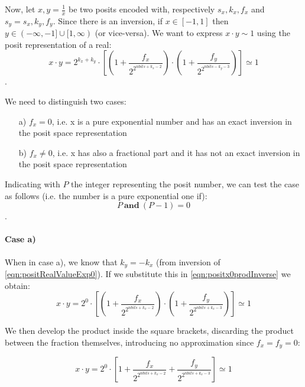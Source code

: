 Now, let $x, y = \frac{1}{x}$ be two posits encoded with, respectively $s_x,k_x, f_x$ and $s_y = s_x, k_y, f_y$. Since there is an inversion, if $x \in [-1,1]$ then $y \in (-\infty, -1] \cup [1,\infty)$ (or vice-versa). We want to express $x \cdot y \sim 1$ using the posit representation of a real:
\begin{equation}\label{eqn:positx0prodInverse}
    x \cdot y = 2^{k_x+k_y} \cdot \left[ \left (1 + \frac{f_x}{2^{2^{nbits + k_x - 2}}} \right ) \cdot \left (1 + \frac{f_y}{2^{2^{nbits - k_y - 3}}} \right ) \right] \simeq 1
\end{equation}.

We need to distinguish two cases:
\begin{itemize}
    \item[a)]$f_x = 0$, i.e. x is a pure exponential number and has an exact inversion in the posit space representation
    \item[b)] $f_x \neq 0$, i.e. x has also a fractional part and it has not an exact inversion in the posit space representation
\end{itemize}

Indicating with $P$ the integer representing the posit number, we can test the case as follows (i.e. the number is a pure exponential one if): 
\begin{equation}
    P\ \mathbf{and}\ (P - 1) = 0
\end{equation}.

\paragraph{Case a)} When in case a), we know that $k_y = -k_x$ (from inversion of \eqref{eqn:positRealValueExp0}). If we substitute this in \eqref{eqn:positx0prodInverse} we obtain:
\begin{equation}
    x \cdot y = 2^{0} \cdot \left[ \left (1 + \frac{f_x}{2^{2^{nbits + k_x - 2}}} \right ) \cdot \left (1 + \frac{f_y}{2^{2^{nbits + k_x - 3}}} \right ) \right] \simeq 1
\end{equation}

We then develop the product inside the square brackets, discarding the product between the fraction themselves, introducing no approximation since $f_x = f_y = 0$:

\begin{equation}
    x \cdot y = 2^{0} \cdot \left[ 1 + \frac{f_x}{2^{2^{nbits + k_x - 2}}}  + \frac{f_y}{2^{2^{nbits + k_x - 3}}} \right] \simeq 1
\end{equation}

